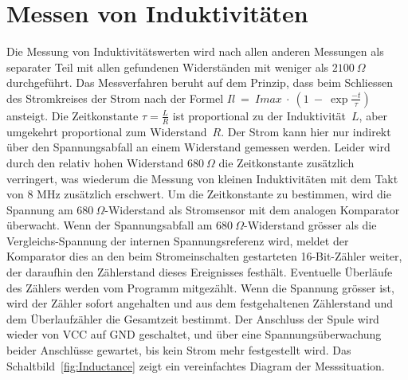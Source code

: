 \section{Messen von Induktivit\"aten}
Die Messung von Induktivit\"atswerten wird nach allen anderen Messungen als separater Teil mit allen
gefundenen Widerst\"anden mit weniger als \(2100~\Omega\) durchgef\"uhrt.
Das Messverfahren beruht auf dem Prinzip, dass beim Schliessen des Stromkreises der Strom nach
der Formel \(Il~=~Imax~\cdot~(1~-~\exp{\frac{-t}{\tau}})\) ansteigt.
Die Zeitkonstante \(\tau = \frac{L}{R}\) ist proportional zu der Induktivit\"at~\(L\), aber umgekehrt
proportional zum Widerstand~\(R\). 
Der Strom kann hier nur indirekt \"uber den Spannungsabfall an einem Widerstand
gemessen werden.
Leider wird durch den relativ hohen Widerstand \(680~\Omega\) die Zeitkonstante zus\"atzlich verringert, was
wiederum die Messung von kleinen Induktivit\"aten mit dem Takt von 8 MHz zus\"atzlich erschwert.
Um die Zeitkonstante zu bestimmen, wird die Spannung am \(680~\Omega\)-Widerstand als Stromsensor
mit dem analogen Komparator \"uberwacht. Wenn der Spannungsabfall am \(680~\Omega\)-Widerstand gr\"osser als
die Vergleichs-Spannung der internen Spannungsreferenz wird, meldet der Komparator dies an den beim
Stromeinschalten gestarteten 16-Bit-Z\"ahler weiter, der daraufhin den Z\"ahlerstand dieses
Ereignisses festh\"alt. Eventuelle \"Uberl\"aufe des Z\"ahlers werden vom Programm mitgez\"ahlt. 
Wenn die Spannung gr\"osser ist, wird der Z\"ahler sofort angehalten und aus dem festgehaltenen Z\"ahlerstand und
dem \"Uberlaufz\"ahler die Gesamtzeit bestimmt.
Der Anschluss der Spule wird wieder von VCC auf GND geschaltet, und \"uber eine Spannungs\"uberwachung beider
Anschl\"usse gewartet, bis kein Strom mehr festgestellt wird.
Das Schaltbild~\ref{fig:Inductance} zeigt ein vereinfachtes Diagram der Messsituation.

